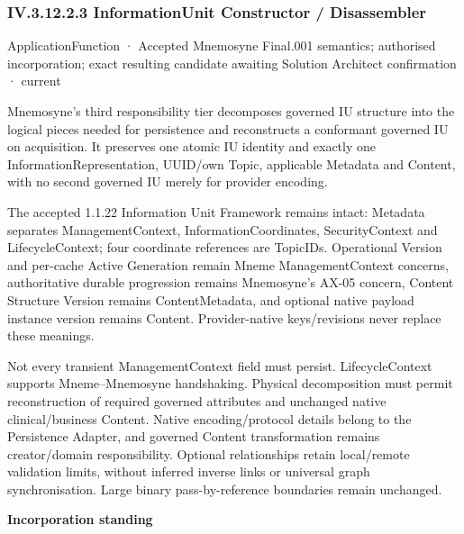 \subsubsection*{IV.3.12.2.3 InformationUnit Constructor / Disassembler}
\label{navigation:IV.3.12.2.3}

\label{element:75349ac7a0d44dec955b77bb5ecf1151}
{\small ApplicationFunction · Accepted Mnemosyne Final.001 semantics; authorised incorporation; exact resulting candidate awaiting Solution Architect confirmation · current}\par

Mnemosyne's third responsibility tier decomposes governed IU structure into the logical pieces needed for persistence and reconstructs a conformant governed IU on acquisition. It preserves one atomic IU identity and exactly one InformationRepresentation, UUID/own Topic, applicable Metadata and Content, with no second governed IU merely for provider encoding.



The accepted 1.1.22 Information Unit Framework remains intact: Metadata separates ManagementContext, InformationCoordinates, SecurityContext and LifecycleContext; four coordinate references are TopicIDs. Operational Version and per-cache Active Generation remain Mneme ManagementContext concerns, authoritative durable progression remains Mnemosyne's AX-05 concern, Content Structure Version remains ContentMetadata, and optional native payload instance version remains Content. Provider-native keys/revisions never replace these meanings.



Not every transient ManagementContext field must persist. LifecycleContext supports Mneme–Mnemosyne handshaking. Physical decomposition must permit reconstruction of required governed attributes and unchanged native clinical/business Content. Native encoding/protocol details belong to the Persistence Adapter, and governed Content transformation remains creator/domain responsibility. Optional relationships retain local/remote validation limits, without inferred inverse links or universal graph synchronisation. Large binary pass-by-reference boundaries remain unchanged.



\par\medskip\textbf{Incorporation standing}\par


